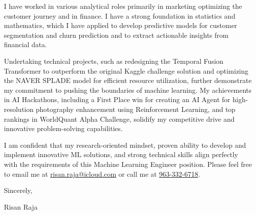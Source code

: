 \documentclass{ExpressiveCoverLetter}
\begin{document}
I have worked in various analytical roles primarily in marketing
optimizing the customer journey and in finance. I have a strong foundation in
statistics and mathematics, which I have applied to develop
predictive models for customer segmentation and churn prediction
and to extract actionable insights from financial data.

Undertaking technical projects, such as redesigning the Temporal Fusion 
Transformer to outperform the original Kaggle challenge solution 
and optimizing the NAVER SPLADE model for efficient resource 
utilization, further demonstrate my commitment to pushing the boundaries 
of machine learning. My achievements in AI Hackathons, including a First 
Place win for creating an AI Agent for high-resolution photography
enhancement using Reinforcement Learning, and top rankings in WorldQuant Alpha
Challenge, solidify my competitive drive and innovative problem-solving capabilities.

I am confident that my research-oriented mindset, 
proven ability to develop and implement innovative ML solutions, 
and strong technical skills align perfectly with the requirements of 
this Machine Learning Engineer position. Please feel free to
email me at \href{mailto:risan.raja@icloud.com}{risan.raja@icloud.com} or
call me at \href{tel:+91-963-332-6718}{963-332-6718}.

Sincerely,
\vspace{.15in}

Risan Raja
\end{document}
